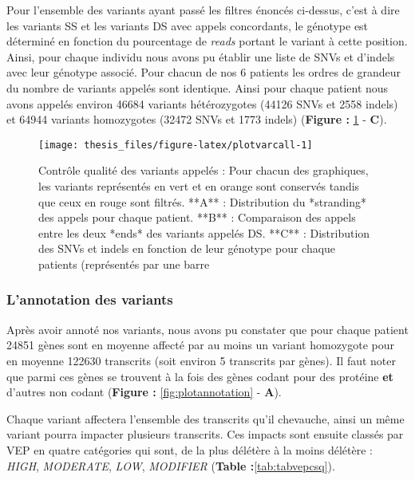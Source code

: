 \documentclass[12pt,twoside]{reedthesis}
\theoremstyle{definition}
\theoremstyle{definition}
\theoremstyle{remark}
\begin{document}
  Pour l'ensemble des variants ayant passé les filtres énoncés ci-dessus,
  c'est à dire les variants SS et les variants DS avec appels concordants,
  le génotype est déterminé en fonction du pourcentage de \emph{reads}
  portant le variant à cette position. Ainsi, pour chaque individu nous
  avons pu établir une liste de SNVs et d'indels avec leur génotype
  associé. Pour chacun de nos 6 patients les ordres de grandeur du nombre
  de variants appelés sont identique. Ainsi pour chaque patient nous avons
  appelés environ 46684 variants hétérozygotes (44126 SNVs et 2558 indels)
  et 64944 variants homozygotes (32472 SNVs et 1773 indels)
  (\textbf{Figure : }\ref{fig:plotvarcall} - \textbf{C}).
  
  \newpage
  
  \begin{figure}
  
  {\centering \texttt{[image: thesis\_files/figure-latex/plotvarcall-1]} 
  
  }
  
  \caption[Contrôle qualité des variants appelés]{Contrôle qualité des variants appelés : Pour chacun des graphiques, les variants représentés en vert et en orange sont conservés tandis que ceux en rouge sont filtrés. **A** : Distribution du *stranding* des appels pour chaque patient. **B** : Comparaison des appels entre les deux *ends* des variants appelés DS. **C** : Distribution des SNVs et indels en fonction de leur génotype pour chaque patients (représentés par une barre}\label{fig:plotvarcall}
  \end{figure}
  
  \newpage
  
  \subsubsection{L'annotation des
  variants}\label{lannotation-des-variants}
  
  Après avoir annoté nos variants, nous avons pu constater que pour chaque
  patient 24851 gènes sont en moyenne affecté par au moins un variant
  homozygote pour en moyenne 122630 transcrits (soit environ 5 transcrits
  par gènes). Il faut noter que parmi ces gènes se trouvent à la fois des
  gènes codant pour des protéine \textbf{et} d'autres non codant
  (\textbf{Figure : }\ref{fig:plotannotation} - \textbf{A}).
  
  Chaque variant affectera l'ensemble des transcrits qu'il chevauche,
  ainsi un même variant pourra impacter plusieurs transcrits. Ces impacts
  sont ensuite classés par VEP en quatre catégories qui sont, de la plus
  délétère à la moins délétère : \emph{HIGH}, \emph{MODERATE}, \emph{LOW},
  \emph{MODIFIER} (\textbf{Table :}\ref{tab:tabvepcsq}).
  
\end{document}
